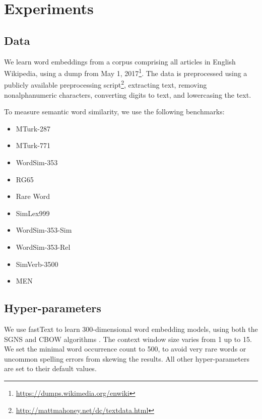 \documentclass[11pt,a4paper]{article}
\begin{document}
    
    \section{Experiments}\label{sec:exp}
    
    \subsection{Data}\label{sec:data}
    We learn word embeddings from a corpus comprising all articles in English Wikipedia,
    using a dump from May 1, 2017\footnote{\url{https://dumps.wikimedia.org/enwiki}}.
    The data is preprocessed using a publicly available preprocessing
    script\footnote{\url{http://mattmahoney.net/dc/textdata.html}},
    extracting text, removing nonalphanumeric characters,
    converting digits to text, and lowercasing the text.
    
    To measure semantic word similarity, we use the following benchmarks:
    \begin{itemize}
        \item MTurk-287~\cite{radinsky2011word}
        \item MTurk-771~\cite{halawi2012large}
        \item WordSim-353~\cite{finkelstein2001placing}
        \item RG65~\cite{rubenstein1965contextual}
        \item Rare Word~\cite{luong2013better}
        \item SimLex999~\cite{hill2015simlex}
        \item WordSim-353-Sim~\cite{agirre2009study}
        \item WordSim-353-Rel~\cite{zesch2008using}
        \item SimVerb-3500~\cite{Gerz2016emnlp}
        \item MEN~\cite{bruni2012distributional}
    \end{itemize}
    
    \subsection{Hyper-parameters}\label{sec:hyperparams}
    We use fastText \cite{bojanowski2016enriching} to learn
    300-dimensional word embedding models,
    using both the SGNS and CBOW algorithms \cite{mikolov2013efficient}.
    The context window size varies from 1 up to 15.
    We set the minimal word occurrence count to 500, to avoid
    very rare words or uncommon spelling errors from skewing the results.
    All other hyper-parameters are set to their default values.
    
\end{document}
